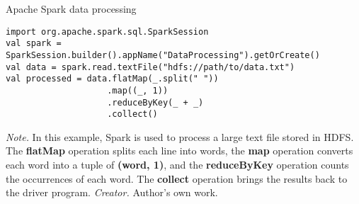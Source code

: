 \begin{table}[h!]
\caption{Apache Spark data processing}
\begin{lstlisting}
import org.apache.spark.sql.SparkSession
val spark = SparkSession.builder().appName("DataProcessing").getOrCreate()
val data = spark.read.textFile("hdfs://path/to/data.txt")
val processed = data.flatMap(_.split(" "))
                    .map((_, 1))
                    .reduceByKey(_ + _)
                    .collect()
\end{lstlisting}
\small
\textit{Note.} In this example, Spark is used to process a large text file stored in HDFS. The \textbf{flatMap} operation splits each line into words, the \textbf{map} operation converts each word into a tuple of \textbf{(word, 1)}, and the \textbf{reduceByKey} operation counts the occurrences of each word. The \textbf{collect} operation brings the results back to the driver program.
\textit{Creator.} Author's own work.
\end{table}